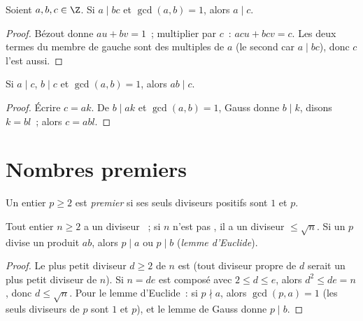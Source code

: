 \begin{theorem}\label{thm:g12:arith:gauss}
Soient $a, b, c \in \Z$. Si $a \mid bc$ et $\gcd(a, b) = 1$, alors $a \mid c$.
\end{theorem}

\begin{proof}
Bézout donne $au + bv = 1$~; multiplier par $c$~: $acu + bcv = c$. Les deux
termes du membre de gauche sont des multiples de $a$ (le second car
$a \mid bc$), donc $c$ l'est aussi.
\end{proof}

\begin{corollary}\label{cor:g12:arith:coprimeprod}
Si $a \mid c$, $b \mid c$ et $\gcd(a,b) = 1$, alors $ab \mid c$.
\end{corollary}

\begin{proof}
Écrire $c = ak$. De $b \mid ak$ et $\gcd(a,b)=1$, Gauss donne
$b \mid k$, disons $k = bl$~; alors $c = abl$.
\end{proof}

\section{Nombres premiers}

\begin{definition}[Premier]\label{def:g12:arith:prime}
Un entier $p \geq 2$ est \emph{premier} si ses seuls
diviseurs positifs sont $1$ et $p$.
\end{definition}

\begin{proposition}\label{prop:g12:arith:primedivides}
Tout entier $n \geq 2$ a un diviseur ~; si $n$ n'est pas , il
a un diviseur  $\leq \sqrt n$. Si un  $p$ divise un produit
$ab$, alors $p \mid a$ ou $p \mid b$ (\emph{lemme d'Euclide}).
\end{proposition}

\begin{proof}
Le plus petit diviseur $d \geq 2$ de $n$ est  (tout diviseur propre
de $d$ serait un plus petit diviseur de $n$). Si $n = de$ est composé avec
$2 \leq d \leq e$, alors $d^2 \leq de = n$, donc $d \leq \sqrt n$. Pour le
lemme d'Euclide~: si $p \nmid a$, alors $\gcd(p, a) = 1$ (les seuls
diviseurs de $p$ sont $1$ et $p$), et le lemme de Gauss donne $p \mid b$.
\end{proof}

